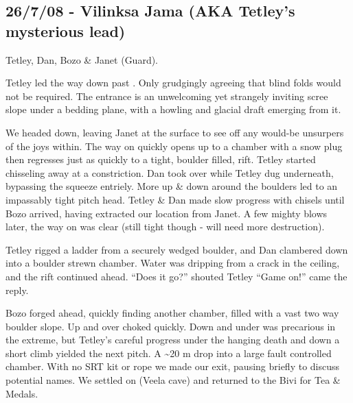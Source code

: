 \subsection{26/7/08 - Vilinksa Jama (AKA Tetley's mysterious
lead)}



Tetley, Dan, Bozo \& Janet (Guard).

Tetley led the way down past . Only grudgingly agreeing that blind
folds would not be required. The entrance is an unwelcoming yet
strangely inviting scree slope under a bedding plane, with a howling and
glacial draft emerging from it.

We headed down, leaving Janet at the surface to see off any would-be
unsurpers of the joys within. The way on quickly opens up to a chamber
with a snow plug then regresses just as quickly to a tight, boulder
filled, rift. Tetley started chisseling away at a constriction. Dan took
over while Tetley dug underneath, bypassing the squeeze entriely. More
up \& down around the boulders led to an impassably tight pitch head.
Tetley \& Dan made slow progress with chisels until Bozo arrived, having
extracted our location from Janet. A few mighty blows later, the way on
was clear (still tight though - will need more destruction).


Tetley rigged a ladder from a securely wedged boulder, and Dan clambered
down into a boulder strewn chamber. Water was dripping from a crack in
the ceiling, and the rift continued ahead. ``Does it go?'' shouted
Tetley ``Game on!'' came the reply.

Bozo forged ahead, quickly finding another chamber, filled with a vast
two way boulder slope. Up and over choked quickly. Down and under was
precarious in the extreme, but Tetley's careful progress under the
hanging death and down a short climb yielded the next pitch. A
\textasciitilde 20 m drop into a large fault controlled chamber. With no
SRT kit or rope we made our exit, pausing briefly to discuss potential
names. We settled on  (Veela cave) and returned to the Bivi
for Tea \& Medals. 


